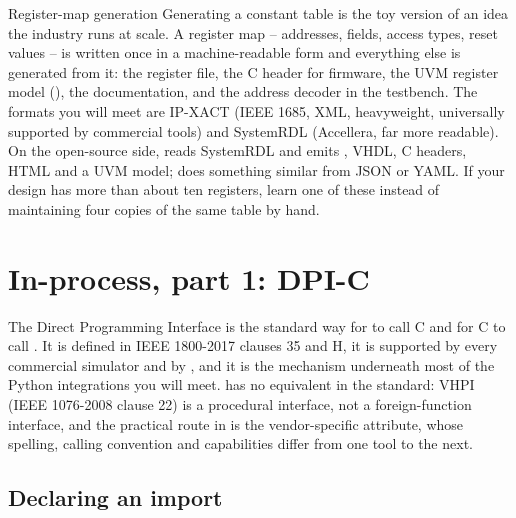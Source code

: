 \begin{notebox}{Register-map generation}
Generating a constant table is the toy version of an idea the industry runs
at scale. A register map -- addresses, fields, access types, reset values --
is written once in a machine-readable form and everything else is generated
from it: the \RTL{} register file, the C header for firmware, the UVM
register model (), the documentation, and the address decoder in
the testbench. The formats you will meet are IP-XACT (IEEE 1685, XML,
heavyweight, universally supported by commercial tools) and SystemRDL
(Accellera, far more readable). On the open-source side,  reads
SystemRDL and emits \SV{}, VHDL, C headers, HTML and a UVM model;
 does something similar from JSON or YAML. If your design has
more than about ten registers, learn one of these instead of maintaining four
copies of the same table by hand.
\end{notebox}

\section{In-process, part 1: DPI-C}
\label{sec:python:dpi}

The Direct Programming Interface is the standard way for \SV{} to call C and
for C to call \SV{}. It is defined in IEEE 1800-2017 clauses 35 and H, it is
supported by every commercial simulator and by , and it is
the mechanism underneath most of the Python integrations you will meet.
\VHDL{} has no equivalent in the standard: VHPI (IEEE 1076-2008 clause 22) is
a procedural interface, not a foreign-function interface, and the practical
route in \VHDL{} is the vendor-specific  attribute, whose
spelling, calling convention and capabilities differ from one tool to the
next.

\subsection{Declaring an import}

